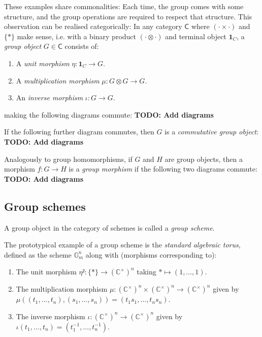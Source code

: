 \documentclass{article}
\begin{document}
These examples share commonalities: Each time, the group comes with some structure,
and the group operations are required to respect that structure.
This observation can be realised categorically:
In any category $\mathsf C$ where $(\cdot \times \cdot)$ and $\{*\}$ make sense,
i.e. with a binary product $(\cdot \otimes \cdot)$ and terminal object $\mathbf 1_C$,
a \emph{group object} $G \in \mathsf C$ consists of:
\begin{enumerate}
  \item A \emph{unit morphism} $\eta : \mathbf 1_C \to G$.
  \item A \emph{multiplication morphism} $\mu : G \otimes G \to G$.
  \item An \emph{inverse morphism} $\iota : G \to G$.
\end{enumerate}

making the following diagrams commute:
{\bf TODO: Add diagrams}

If the following further diagram commutes, then $G$ is a \emph{commutative group object}:
{\bf TODO: Add diagrams}

Analogously to group homomorphisms, if $G$ and $H$ are group objects,
then a morphism $f : G \to H$ is a \emph{group morphism} if the following two diagrams commute:
{\bf TODO: Add diagrams}


\subsection{Group schemes}


A group object in the category of schemes is called a \emph{group scheme}.

The prototypical example of a group scheme is the \emph{standard algebraic torus},
defined as the scheme $\mathbb G_m^n$ along with (morphisms corresponding to):
\begin{enumerate}
  \item The unit morphism $\eta ²: \{*\} \to (\mathbb C^\times)^n$ taking $* \mapsto (1, \dots, 1)$.
  \item The multiplication morphism $\mu : (\mathbb C^\times)^n \times (\mathbb C^\times)^n \to (\mathbb C^\times)^n$
  given by $\mu((t_1, \dots, t_n),(s_1, \dots, s_n)) = (t_1s_1, \dots, t_n s_n)$.
  \item The inverse morphism $\iota : (\mathbb C^\times)^n \to (\mathbb C^\times)^n$
  given by $\iota(t_1, \dots, t_n) = (t_1^{-1}, \dots, t_n^{-1})$.
\end{enumerate}
\end{document}
